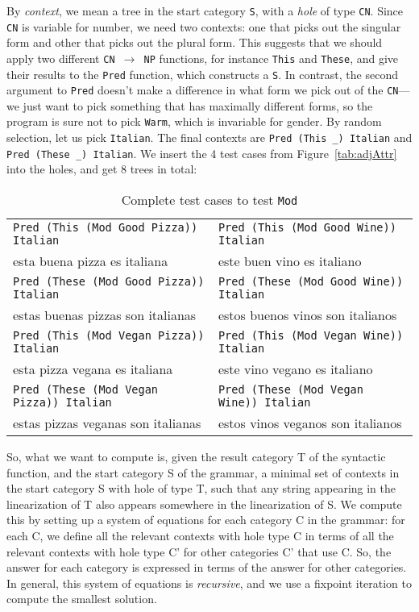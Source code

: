 \documentclass[11pt]{article}
\def\t#1{\texttt{#1}}
\begin{document}
By \emph{context}, we mean a tree in the start category \t{S}, with a 
\emph{hole} of type \t{CN}. 
Since \t{CN} is variable for number, we need two contexts: 
one that picks out the singular form and other that picks out
the plural form. 
This suggests that we should apply two different
\t{CN $\rightarrow$ NP} functions, for instance \t{This} and \t{These}, and
give their results to the \t{Pred} function, which constructs a \t{S}.
In contrast, the second argument to \t{Pred} doesn't make a difference
in what form we pick out of the \t{CN}---we just want to pick
something that has maximally different forms, so the program is sure
not to pick \t{Warm}, which is invariable for gender. By random
selection, let us pick \t{Italian}.
The final contexts are \verb|Pred (This _) Italian| and \verb|Pred (These _) Italian|.
We insert the 4 test cases from Figure~\ref{tab:adjAttr} into the
holes, and get 8 trees in total: 

\begin{table}
\centering
\begin{tabular}{| l | l |}
\hline
\t{Pred (This (Mod Good Pizza)) Italian} & \t{Pred (This (Mod Good Wine))
                                        Italian} \\ 
esta buena pizza es italiana          & este buen vino es italiano \\ \hline
\t{Pred (These (Mod Good Pizza)) Italian} & \t{Pred (These (Mod Good Wine))
                                        Italian} \\ 
estas buenas pizzas son italianas          & estos buenos vinos son italianos \\ \hline
\t{Pred (This (Mod Vegan Pizza)) Italian} & \t{Pred (This (Mod Vegan Wine))
                                        Italian} \\ 
esta pizza vegana es italiana          & este vino vegano es italiano \\ \hline
\t{Pred (These (Mod Vegan Pizza)) Italian} & \t{Pred (These (Mod Vegan Wine))
                                        Italian} \\ 
estas pizzas veganas son italianas          & estos vinos veganos son italianos \\ \hline
\end{tabular}
\caption{Complete test cases to test \t{Mod}}
\label{tab:testCases}
\end{table}

So, what we want to compute is, given the result category T of the syntactic function, and the start category S of the grammar, a minimal set of contexts in the start category S with hole of type T, such that any string appearing in the linearization of T also appears somewhere in the linearization of S. We compute this by setting up a system of equations for each category C in the grammar: for each C, we define all the relevant contexts with hole type C in terms of all the relevant contexts with hole type C' for other categories C' that use C. So, the answer for each category is expressed in terms of the answer for other categories. In general, this system of equations is \emph{recursive}, and we use a fixpoint iteration to compute the smallest solution.
\end{document}

